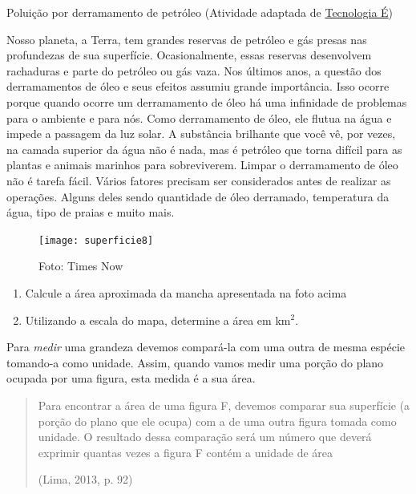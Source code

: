\begin{task}{Poluição por derramamento de petróleo}
(Atividade adaptada de \href{https://www.tecnologiae.com.br/poluicao-derramamento-petroleo-quais-consequencias/}{Tecnologia É})

Nosso planeta, a Terra, tem grandes reservas de petróleo e gás presas nas profundezas de sua superfície. Ocasionalmente, essas reservas desenvolvem rachaduras e parte do petróleo ou gás vaza. Nos últimos anos, a questão dos derramamentos de óleo e seus efeitos assumiu grande importância. Isso ocorre porque quando ocorre um derramamento de óleo há uma infinidade de problemas para o ambiente e para nós. Como derramamento de óleo, ele flutua na água e impede a passagem da luz solar. A substância brilhante que você vê, por vezes, na camada superior da água não é nada, mas é petróleo que torna difícil para as plantas e animais marinhos para sobreviverem. Limpar o derramamento de óleo não é tarefa fácil. Vários fatores precisam ser considerados antes de realizar as operações. Alguns deles sendo quantidade de óleo derramado, temperatura da água, tipo de praias e muito mais.

\begin{figure}[H]
\centering

\texttt{[image: superficie8]}


\caption{Foto: Times Now}
\end{figure}

\begin{enumerate}
  \item Calcule a área aproximada da mancha apresentada na foto acima
  \item Utilizando a escala do mapa, determine a área em km$^2$.
\end{enumerate}

\end{task}


Para \textit{medir} uma grandeza devemos compará-la com uma outra de mesma espécie tomando-a como unidade. Assim, quando vamos medir uma porção do plano ocupada por uma figura, esta medida é a sua área.

\begin{quote}
Para encontrar a área de uma figura F, devemos comparar sua superfície (a porção do plano que ele ocupa) com a de uma outra figura tomada como unidade. O resultado dessa comparação será um número que deverá exprimir quantas vezes a figura F contém a unidade de área 
\flushright

(Lima, 2013, p. 92)
\end{quote}


